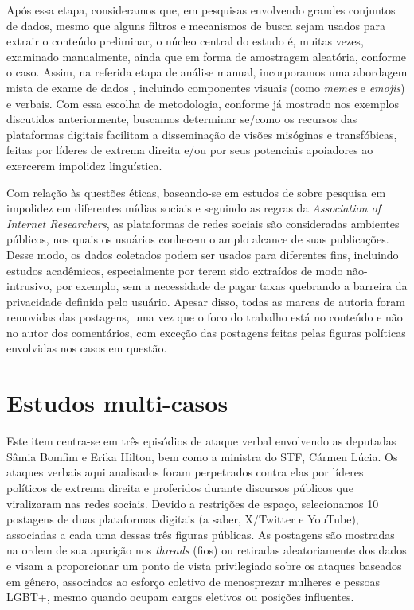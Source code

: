 \documentclass[portuguese]{textolivre}
\begin{document}
Após essa etapa, consideramos que, em pesquisas envolvendo grandes conjuntos de dados, mesmo que alguns filtros e mecanismos de busca sejam usados para extrair o conteúdo preliminar, o núcleo central do estudo é, muitas vezes, examinado manualmente, ainda que em forma de amostragem aleatória, conforme o caso. Assim, na referida etapa de análise manual, incorporamos uma abordagem mista de exame de dados \cite{unger2016}, incluindo componentes visuais (como \textit{memes} e \textit{emojis}) e verbais. Com essa escolha de metodologia, conforme já mostrado nos exemplos discutidos anteriormente, buscamos determinar se/como os recursos das plataformas digitais facilitam a disseminação de visões misóginas e transfóbicas, feitas por líderes de extrema direita e/ou por seus potenciais apoiadores ao exercerem impolidez linguística.

Com relação às questões éticas, baseando-se em estudos de \textcite{dynel2023} sobre pesquisa em impolidez em diferentes mídias sociais e seguindo as regras da \textit{Association of Internet Researchers}, as plataformas de redes sociais são consideradas ambientes públicos, nos quais os usuários conhecem o amplo alcance de suas publicações. Desse modo, os dados coletados podem ser usados para diferentes fins, incluindo estudos acadêmicos, especialmente por terem sido extraídos de modo não-intrusivo, por exemplo, sem a necessidade de pagar taxas quebrando a barreira da privacidade definida pelo usuário. Apesar disso, todas as marcas de autoria foram removidas das postagens, uma vez que o foco do trabalho está no conteúdo e não no autor dos comentários, com exceção das postagens feitas pelas figuras políticas envolvidas nos casos em questão.

\section{Estudos multi-casos}\label{sec-3}
Este item centra-se em três episódios de ataque verbal envolvendo as deputadas Sâmia Bomfim e Erika Hilton, bem como a ministra do STF, Cármen Lúcia. Os ataques verbais aqui analisados foram perpetrados contra elas por líderes políticos de extrema direita e proferidos durante discursos públicos que viralizaram nas redes sociais. Devido a restrições de espaço, selecionamos 10 postagens de duas plataformas digitais (a saber, X/Twitter e YouTube), associadas a cada uma dessas três figuras públicas. As postagens são mostradas na ordem de sua aparição nos \textit{threads} (fios) ou retiradas aleatoriamente dos dados e visam a proporcionar um ponto de vista privilegiado sobre os ataques baseados em gênero, associados ao esforço coletivo de menosprezar mulheres e pessoas LGBT+, mesmo quando ocupam cargos eletivos ou posições influentes.
\end{document}
